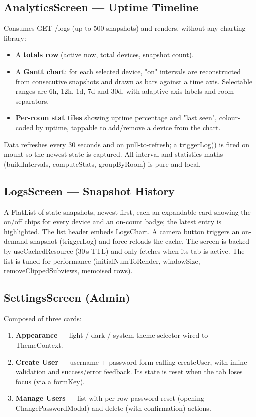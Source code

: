 \documentclass[11pt,a4paper]{article}
\newcommand{\code}[1]{\colorbox{codebg}{\ttfamily\small #1}}
\begin{document}
\subsection{AnalyticsScreen — Uptime Timeline}

Consumes \code{GET /logs} (up to 500 snapshots) and renders, without any
charting library:

\begin{itemize}[leftmargin=1.4em]
  \item A \textbf{totals row} (active now, total devices, snapshot count).
  \item A \textbf{Gantt chart}: for each selected device, "on" intervals are
        reconstructed from consecutive snapshots and drawn as bars against a
        time axis. Selectable ranges are 6h, 12h, 1d, 7d and 30d, with adaptive
        axis labels and room separators.
  \item \textbf{Per-room stat tiles} showing uptime percentage and "last seen",
        colour-coded by uptime, tappable to add/remove a device from the chart.
\end{itemize}

Data refreshes every 30 seconds and on pull-to-refresh; a \code{triggerLog()} is
fired on mount so the newest state is captured. All interval and statistics
maths (\code{buildIntervals}, \code{computeStats}, \code{groupByRoom}) is pure
and local.

\subsection{LogsScreen — Snapshot History}

A \code{FlatList} of state snapshots, newest first, each an expandable card
showing the on/off chips for every device and an on-count badge; the latest
entry is highlighted. The list header embeds \code{LogsChart}. A camera button
triggers an on-demand snapshot (\code{triggerLog}) and force-reloads the cache.
The screen is backed by \code{useCachedResource} (30\,s TTL) and only fetches
when its tab is active. The list is tuned for performance
(\code{initialNumToRender}, \code{windowSize}, \code{removeClippedSubviews},
memoised rows).

\subsection{SettingsScreen (Admin)}

Composed of three cards:

\begin{enumerate}[leftmargin=1.5em]
  \item \textbf{Appearance} — light / dark / system theme selector wired to
        \code{ThemeContext}.
  \item \textbf{Create User} — username + password form calling
        \code{createUser}, with inline validation and success/error feedback.
        Its state is reset when the tab loses focus (via a \code{formKey}).
  \item \textbf{Manage Users} — list with per-row password-reset (opening
        \code{ChangePasswordModal}) and delete (with confirmation) actions.
\end{enumerate}
\end{document}
